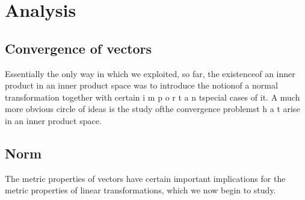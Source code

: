 \chapter{Analysis}

\section{Convergence of vectors}

Essentially the only way in which we exploited, so far, the existenceof an inner
product in an inner product space was to introduce the notionof a normal
transformation together with certain i m p o r t a n tspecial cases of it. A
much more obvious circle of ideas is the study ofthe convergence problemst h a t
arise in an inner product space.

\section{Norm}
The metric properties of vectors have certain important implications for the
metric properties of linear transformations, which we now begin to study.